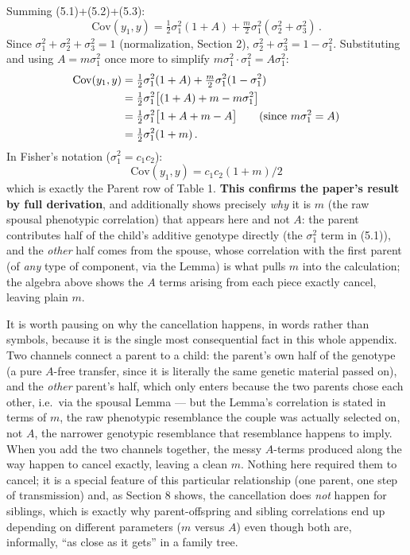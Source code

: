 \documentclass[12pt]{article}
\begin{document}
Summing (5.1)+(5.2)+(5.3):
\begin{equation}
\mathrm{Cov}(y_1,y) = \tfrac12\sigma_1^2(1+A) + \tfrac{m}{2}\sigma_1^2(\sigma_2^2+\sigma_3^2) \, .
\end{equation}
Since $\sigma_1^2+\sigma_2^2+\sigma_3^2=1$ (normalization, Section 2), $\sigma_2^2+\sigma_3^2 = 1-\sigma_1^2$. Substituting and using $A=m\sigma_1^2$ once more to simplify $m\sigma_1^2\cdot\sigma_1^2 = A\sigma_1^2$:
\begin{align}
\mathrm{Cov}(y_1,y) &= \tfrac12\sigma_1^2(1+A) + \tfrac{m}{2}\sigma_1^2(1-\sigma_1^2) \notag \\
&= \tfrac12\sigma_1^2\big[(1+A) + m - m\sigma_1^2\big] \notag \\
&= \tfrac12\sigma_1^2\big[1 + A + m - A\big] \qquad (\text{since } m\sigma_1^2=A) \notag \\
&= \tfrac12\sigma_1^2(1+m) \, .
\end{align}
In Fisher's notation ($\sigma_1^2=c_1c_2$):
\begin{equation}
\boxed{\mathrm{Cov}(y_1,y) = c_1c_2(1+m)/2}
\end{equation}
which is exactly the Parent row of Table 1. \textbf{This confirms the paper's result by full derivation}, and additionally shows precisely \emph{why} it is $m$ (the raw spousal phenotypic correlation) that appears here and not $A$: the parent contributes half of the child's additive genotype directly (the $\sigma_1^2$ term in (5.1)), and the \emph{other} half comes from the spouse, whose correlation with the first parent (of \emph{any} type of component, via the Lemma) is what pulls $m$ into the calculation; the algebra above shows the $A$ terms arising from each piece exactly cancel, leaving plain $m$.

It is worth pausing on why the cancellation happens, in words rather than symbols, because it is the single most consequential fact in this whole appendix. Two channels connect a parent to a child: the parent's own half of the genotype (a pure $A$-free transfer, since it is literally the same genetic material passed on), and the \emph{other} parent's half, which only enters because the two parents chose each other, i.e.\ via the spousal Lemma — but the Lemma's correlation is stated in terms of $m$, the raw phenotypic resemblance the couple was actually selected on, not $A$, the narrower genotypic resemblance that resemblance happens to imply. When you add the two channels together, the messy $A$-terms produced along the way happen to cancel exactly, leaving a clean $m$. Nothing here required them to cancel; it is a special feature of this particular relationship (one parent, one step of transmission) and, as Section 8 shows, the cancellation does \emph{not} happen for siblings, which is exactly why parent-offspring and sibling correlations end up depending on different parameters ($m$ versus $A$) even though both are, informally, ``as close as it gets'' in a family tree.
\end{document}
